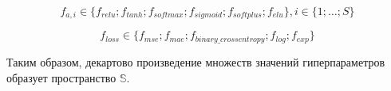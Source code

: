 \begin{equation}\label{eq:hyper4}
  f_{a,i} \in \{f_{relu}; f_{tanh}; f_{softmax}; f_{sigmoid}; f_{softplus}; f_{elu}\}, i \in \{1; \dots; S\}
\end{equation}

\begin{equation}\label{eq:hyper4}
  f_{loss} \in \{f_{mse}; f_{mae}; f_{binary\_crossentropy}; f_{log}; f_{exp}\}
\end{equation}

Таким образом, декартово произведение множеств значений гиперпараметров образует пространство $\mathbb{S}$.

\newpage 